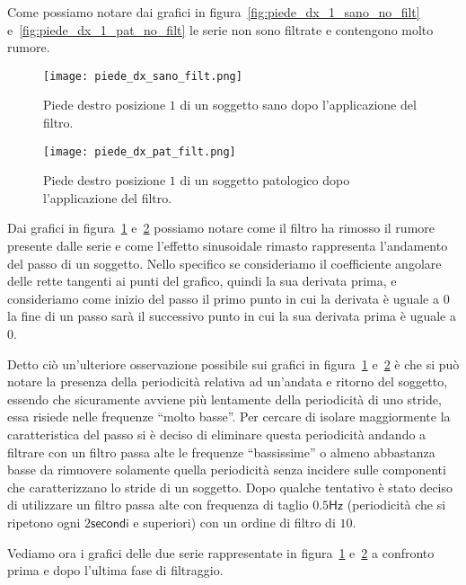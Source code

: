 Come possiamo notare dai grafici in figura~\ref{fig:piede_dx_1_sano_no_filt} 
e~\ref{fig:piede_dx_1_pat_no_filt} le serie non sono filtrate e contengono molto rumore.

\begin{figure}[H]
    \centering
    \texttt{[image: piede\_dx\_sano\_filt.png]}
    \caption{Piede destro posizione $1$ di un soggetto sano dopo l'applicazione del filtro.}
    \label{fig:piede_dx_1_sano_filt}
\end{figure}

\begin{figure}[H]
    \centering
    \texttt{[image: piede\_dx\_pat\_filt.png]}
    \caption{Piede destro posizione $1$ di un soggetto patologico dopo l'applicazione del filtro.}
    \label{fig:piede_dx_1_pat_filt}
\end{figure}


Dai grafici in figura~\ref{fig:piede_dx_1_sano_filt} 
e~\ref{fig:piede_dx_1_pat_filt} possiamo notare come il filtro ha rimosso il rumore 
presente dalle serie e come l'effetto sinusoidale rimasto rappresenta l'andamento del passo di 
un soggetto.
Nello specifico se consideriamo il coefficiente angolare delle rette tangenti ai punti del 
grafico, quindi la sua derivata prima, e consideriamo come inizio del passo il 
primo punto in cui la derivata è uguale a $0$ la fine di un passo sarà il successivo punto 
in cui la sua derivata prima è uguale a $0$. 

Detto ciò un'ulteriore osservazione possibile sui grafici in figura~\ref{fig:piede_dx_1_sano_filt} 
e~\ref{fig:piede_dx_1_pat_filt} è che si può notare la presenza della periodicità
relativa ad un'andata e ritorno del soggetto,
essendo che sicuramente avviene più lentamente della periodicità di uno stride, essa
risiede nelle frequenze ``molto basse''. 
Per cercare di isolare maggiormente la caratteristica del passo
si è deciso di eliminare questa periodicità
andando a filtrare con un filtro passa alte le frequenze ``bassissime'' o almeno
abbastanza basse da rimuovere solamente quella periodicità senza 
incidere sulle componenti che caratterizzano lo stride di un soggetto. 
Dopo qualche tentativo
è stato deciso di utilizzare un filtro passa alte con frequenza di taglio $0.5\mathsf{Hz}$
(periodicità che si ripetono ogni $2\mathsf{secondi}$ e superiori) con un ordine di filtro di $10$.

Vediamo ora i grafici delle due serie rappresentate in figura~\ref{fig:piede_dx_1_sano_filt} 
e~\ref{fig:piede_dx_1_pat_filt} a confronto prima e dopo l'ultima fase di filtraggio.

